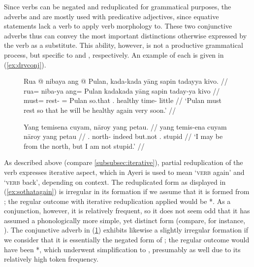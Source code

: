 Since verbs can be negated and reduplicated for grammatical purposes, the
adverbs  and  are mostly used with predicative adjectives, since equative statements
lack a verb to apply verb morphology to. These two conjunctive adverbs thus can
convey the most important distinctions otherwise expressed by the verb as a
substitute. This ability, however, is not a productive grammatical process, but
specific to  and , respectively. An
example of each is given in (\ref{ex:drvconj}).

\begin{figure}[h]
\pex\label{ex:drvconj}
\a\label{ex:sothatagain}\begingl
	\gla Rua @ nibaya ang @ Pulan, kada-kada yāng sapin tadayya kivo. //
	\glb rua= niba-ya ang= Pulan kada\til{}kada yāng sapin taday-ya kivo //
	\glc must= rest-\TsgM{} \Aarg{}= Pulan \Iter{}\til{}so.that 
		\TsgM{}.\Aarg{} healthy time-\Loc{} little //
	\glft `Pulan must rest so that he will be healthy again very soon.' //
\endgl

\a\label{ex:butnot}\begingl
	\gla Yang temisena cuyam, nāroy yang petau. //
	\glb yang temis-ena cuyam nāroy yang petau //
	\glc \Fsg{}.\Aarg{} north-\Gen{} indeed but.not \Fsg{}.\Aarg{} stupid //
	\glft `I may be from the north, but I am not stupid.' //
\endgl
\xe
\end{figure}

As described above (compare \autoref{subsubsec:iterative}), partial
reduplication of the verb expresses iterative aspect, which in Ayeri is used
to mean `\textsc{verb} again' and `\textsc{verb} back', depending on context.
The reduplicated form  as displayed in
(\ref{ex:sothatagain}) is irregular in its formation if we assume that it is
formed from ; the regular outcome with
iterative reduplication applied would be *. As a
conjunction, however, it is relatively frequent, so it does not seem odd that
it has assumed a phonologically more simple, yet distinct form (compare, for
instance, \cite[11--12]{bybeehopper2001b}). The conjunctive adverb in
(\ref{ex:butnot}) exhibits likewise a slightly irregular formation if we
consider that it is essentially the negated form of ;
the regular outcome would have been *, which underwent
simplification to , presumably as well due to its
relatively high token frequency.

